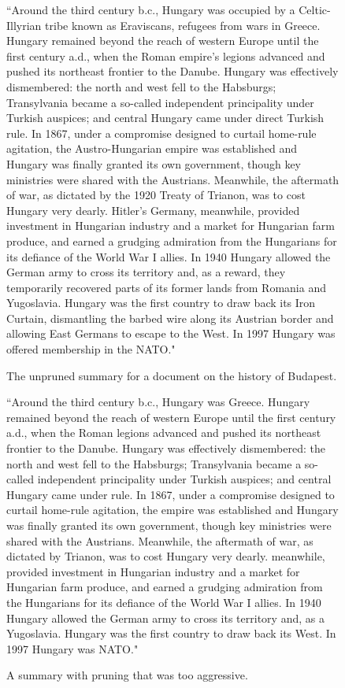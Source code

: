 \documentclass[12pt]{article}
\theoremstyle{plain}
\theoremstyle{definition}
\theoremstyle{remark}
\theoremstyle{plain}
\begin{document}
\begin{figure}
	``Around the third century b.c., Hungary was occupied by a Celtic-Illyrian tribe known as Eraviscans, refugees from wars in Greece.
Hungary remained beyond the reach of western Europe until the first century a.d., when the Roman empire's legions advanced and pushed its northeast frontier to the Danube.
Hungary was effectively dismembered: the north and west fell to the Habsburgs; Transylvania became a so-called independent principality under Turkish auspices; and central Hungary came under direct Turkish rule.
In 1867, under a compromise designed to curtail home-rule agitation, the Austro-Hungarian empire was established and Hungary was finally granted its own government, though key ministries were shared with the Austrians.
Meanwhile, the aftermath of war, as dictated by the 1920 Treaty of Trianon, was to cost Hungary very dearly.
Hitler's Germany, meanwhile, provided investment in Hungarian industry and a market for Hungarian farm produce, and earned a grudging admiration from the Hungarians for its defiance of the World War I allies.
In 1940 Hungary allowed the German army to cross its territory and, as a reward, they temporarily recovered parts of its former lands from Romania and Yugoslavia.
Hungary was the first country to draw back its Iron Curtain, dismantling the barbed wire along its Austrian border and allowing East Germans to escape to the West.
In 1997 Hungary was offered membership in the NATO."
\caption{The unpruned summary for a document on the history of Budapest.}\label{rawsummary}
\end{figure}
	
\begin{figure}``Around the third century b.c., Hungary was Greece. Hungary remained beyond the reach of western Europe until the first century a.d., when the Roman legions advanced and pushed its northeast frontier to the Danube. Hungary was effectively dismembered: the north and west fell to the Habsburgs; Transylvania became a so-called independent principality under Turkish auspices; and central Hungary came under rule. In 1867, under a compromise designed to curtail home-rule agitation, the empire was established and Hungary was finally granted its own government, though key ministries were shared with the Austrians. Meanwhile, the aftermath of war, as dictated by Trianon, was to cost Hungary very dearly. meanwhile, provided investment in Hungarian industry and a market for Hungarian farm produce, and earned a grudging admiration from the Hungarians for its defiance of the World War I allies. In 1940 Hungary allowed the German army to cross its territory and, as a Yugoslavia. Hungary was the first country to draw back its West. In 1997 Hungary was NATO."
\caption{A summary with pruning that was too aggressive.}\label{badsummary}
\end{figure}
\end{document}
